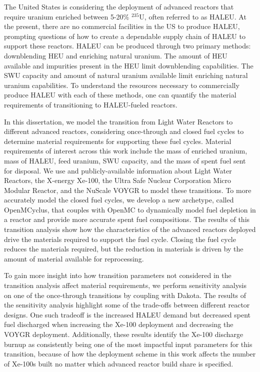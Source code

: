 The United States is considering the deployment of advanced reactors that 
require uranium enriched between 5-20\% $^{235}$U, often referred to 
as \gls{HALEU}. At the present, there are no commercial facilities 
in the US to produce \gls{HALEU}, 
prompting questions of how to create a dependable supply chain of 
\gls{HALEU} to support these reactors. 
\gls{HALEU} can be produced through two primary methods: downblending 
\gls{HEU} and enriching natural uranium. The amount of \gls{HEU} available 
and impurities present in the \gls{HEU} limit downblending capabilities.
The \gls{SWU} capacity and amount of natural uranium available limit 
enriching natural uranium capabilities. To understand the resources necessary 
to commercially produce \gls{HALEU} with each of these methods, one can 
quantify the material requirements of transitioning to \gls{HALEU}-fueled 
reactors. 

In this dissertation, we model the transition from Light Water 
Reactors to different 
advanced reactors, considering once-through and closed 
fuel cycles to determine material requirements for supporting 
these fuel cycles. 
Material requirements of interest across this work include the 
mass of enriched uranium, mass of \gls{HALEU}, feed uranium, 
\gls{SWU} capacity, and the mass of spent fuel sent for disposal.
We use \Cyclus and publicly-available 
information about Light Water Reactors, the X-energy Xe-100, the
Ultra Safe Nuclear Corporation Micro Modular Reactor, and the 
NuScale VOYGR to model these 
transitions. To more accurately model the closed fuel 
cycles, we develop a new \Cyclus archetype, called OpenMCyclus, 
that couples with OpenMC to dynamically model fuel depletion in a 
reactor and provide more accurate spent fuel compositions.
The results of this transition analysis show how the 
characteristics of the advanced reactors deployed drive 
the materials required to support the fuel cycle. Closing the 
fuel cycle reduces the materials required, but the 
reduction in materials is driven by the amount of material 
available for reprocessing. 

To gain more insight into how transition parameters not 
considered in the transition analysis affect material 
requirements, we perform sensitivity 
analysis on one of the once-through transitions by coupling 
\Cyclus with Dakota. The results of 
the sensitivity analysis highlight some of the trade-offs between 
different reactor designs. One such tradeoff is the increased 
\gls{HALEU} demand but decreased spent fuel discharged when increasing 
the Xe-100 deployment and decreasing the VOYGR deployment. Additionally, 
these results identify the Xe-100 discharge burnup as consistently 
being one of the most impactful input parameters for this transition, 
because of how the deployment scheme in this work affects the number of 
Xe-100s built no matter which advanced reactor build share is 
specified. 

